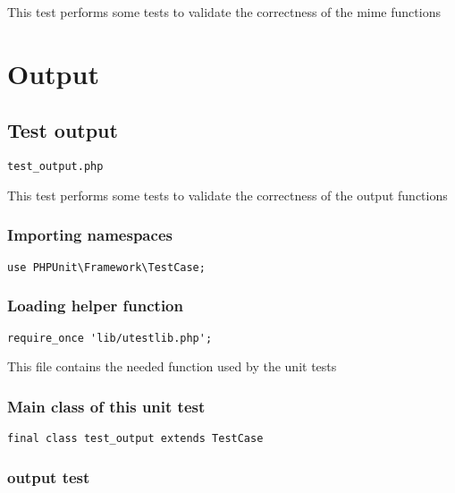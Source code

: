 \documentclass[a4paper]{article}
\begin{document}
This test performs some tests to validate the correctness
of the mime functions


\hypertarget{toc307}{}
\section{Output}

\hypertarget{toc308}{}
\subsection{Test output}

\begin{lstlisting}
test_output.php
\end{lstlisting}

This test performs some tests to validate the correctness
of the output functions

\hypertarget{toc309}{}
\subsubsection{Importing namespaces}

\begin{lstlisting}
use PHPUnit\Framework\TestCase;
\end{lstlisting}

\hypertarget{toc310}{}
\subsubsection{Loading helper function}

\begin{lstlisting}
require_once 'lib/utestlib.php';
\end{lstlisting}

This file contains the needed function used by the unit tests

\hypertarget{toc311}{}
\subsubsection{Main class of this unit test}

\begin{lstlisting}
final class test_output extends TestCase
\end{lstlisting}

\hypertarget{toc312}{}
\subsubsection{output test}
\end{document}
